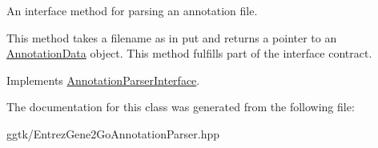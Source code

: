 An interface method for parsing an annotation file. 

This method takes a filename as in put and returns a pointer to an \hyperlink{classAnnotationData}{Annotation\+Data} object. This method fulfills part of the interface contract. 

Implements \hyperlink{classAnnotationParserInterface_a1d5cfb902f088a9cf96fdc6b1e5529ab}{Annotation\+Parser\+Interface}.



The documentation for this class was generated from the following file\+:\begin{DoxyCompactItemize}
\item 
ggtk/Entrez\+Gene2\+Go\+Annotation\+Parser.\+hpp\end{DoxyCompactItemize}
